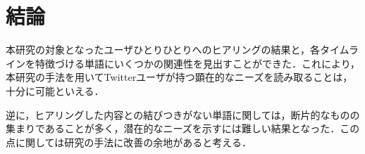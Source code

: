 \chapter{結論}
本研究の対象となったユーザひとりひとりへのヒアリングの結果と，各タイムラインを特徴づける単語にいくつかの関連性を見出すことができた．これにより，本研究の手法を用いてTwitterユーザが持つ顕在的なニーズを読み取ることは，十分に可能といえる．

逆に，ヒアリングした内容との結びつきがない単語に関しては，断片的なものの集まりであることが多く，潜在的なニーズを示すには難しい結果となった．この点に関しては研究の手法に改善の余地があると考える．



